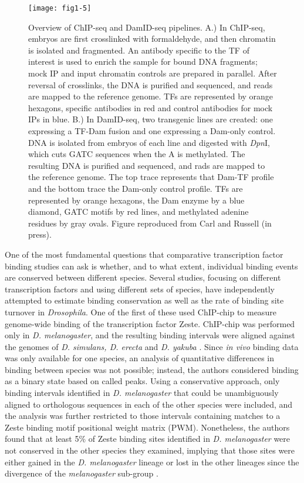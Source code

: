 \begin{figure}
\centering
\texttt{[image: fig1-5]}
\caption{Overview of ChIP-seq and DamID-seq pipelines. A.) In ChIP-seq, embryos are first crosslinked with formaldehyde, and then chromatin is isolated and fragmented. An antibody specific to the TF of interest is used to enrich the sample for bound DNA fragments; mock IP and input chromatin controls are prepared in parallel. After reversal of crosslinks, the DNA is purified and sequenced, and reads are mapped to the reference genome. TFs are represented by orange hexagons, specific antibodies in red and control antibodies for mock IPs in blue. B.) In DamID-seq, two transgenic lines are created: one expressing a TF-Dam fusion and one expressing a Dam-only control. DNA is isolated from embryos of each line and digested with \emph{Dpn}I, which cuts GATC sequences when the A is methylated. The resulting DNA is purified and sequenced, and rads are mapped to the reference genome. The top trace represents that Dam-TF profile and the bottom trace the Dam-only control profile. TFs are represented by orange hexagons, the Dam enzyme by a blue diamond, GATC motifs by red lines, and methylated adenine residues by gray ovals. Figure reproduced from Carl and Russell (in press).}
\label{Figure 1.5}
\end{figure}

One of the most fundamental questions that comparative transcription factor binding studies can ask is whether, and to what extent, individual binding events are conserved between different species. Several studies, focusing on different transcription factors and using different sets of species, have independently attempted to estimate binding conservation as well as the rate of binding site turnover in \emph{Drosophila}. One of the first of these used ChIP-chip to measure genome-wide binding of the transcription factor Zeste. ChIP-chip was performed only in \emph{D. melanogaster}, and the resulting binding intervals were aligned against the genomes of \emph{D. simulans, D. erecta} and \emph{D. yakuba} \citep{moses_large-scale_2006}. Since \emph{in vivo} binding data was only available for one species, an analysis of quantitative differences in binding between species was not possible; instead, the authors considered binding as a binary state based on called peaks. Using a conservative approach, only binding intervals identified in \emph{D. melanogaster} that could be unambiguously aligned to orthologous sequences in each of the other species were included, and the analysis was further restricted to those intervals containing matches to a Zeste binding motif positional weight matrix (PWM). Nonetheless, the authors found that at least 5\% of Zeste binding sites identified in \emph{D. melanogaster} were not conserved in the other species they examined, implying that those sites were either gained in the \emph{D. melanogaster} lineage or lost in the other lineages since the divergence of the \emph{melanogaster} sub-group \citep{moses_large-scale_2006}.\\

